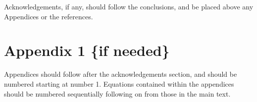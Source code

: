 \begin{acknowledgements}
Acknowledgements, if any, should follow the conclusions, and be placed above any Appendices or the references.
\end{acknowledgements}

\section*{Appendix 1 \{if needed\}}
Appendices should follow after the acknowledgements section, and should be numbered starting at number 1. Equations contained within the appendices should be numbered sequentially following on from those in the main text.







